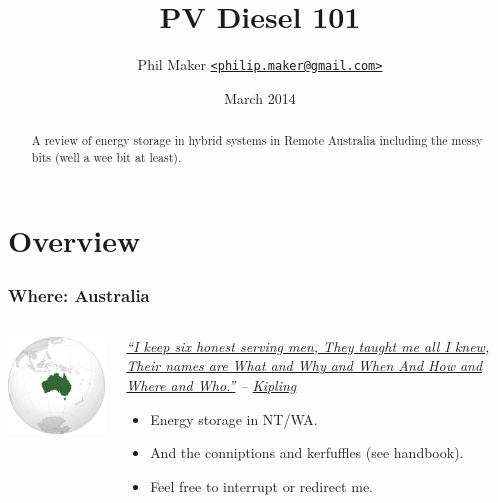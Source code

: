 \documentclass{beamer}
\title{PV Diesel 101}
\author{Phil Maker
  \href{mailto:philip.maker@gmail.com}{\texttt{<philip.maker@gmail.com>}}
}
\institute{ACEP/Powerwater Remote Operations}
\date{March 2014}
\begin{document}
\begin{frame}
  \maketitle
  \vspace{-1.2cm}
  \begin{abstract}
    \small A review of energy storage in hybrid systems in Remote Australia
    including the messy bits (well a wee bit at least).
  \end{abstract}
\end{frame}

\section{Overview}
\begin{frame}\frametitle{Where: Australia}
\begin{columns}
\begin{column}{7cm}
  \includegraphics[width=6cm]{AU.png}
\end{column}
\begin{column}{5cm}\it
\href{http://www.kiplingsociety.co.uk/poems_serving.htm}{``I keep six honest serving men,
They taught me all I knew,
Their names are What and Why and When
And How and Where and Who.''} -- \href{http://en.wikipedia.org/Rudyard_Kipling}{Kipling}
\pause
\begin{itemize}
\item Energy storage in NT/WA.\pause
\item And the conniptions and kerfuffles (see handbook).\pause
\item Feel free to interrupt or redirect me.
\end{itemize}
\end{column}
\end{columns}
\end{frame}
\end{document}
